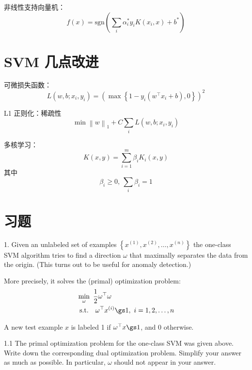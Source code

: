\documentclass[openany]{ctexbook}
\theoremstyle{kaiti}
\theoremstyle{normal}
\begin{document}
非线性支持向量机：
\begin{equation}
  f(x)=\mathrm{sgn} \left(\sum_i\alpha_{i}^{*}y_iK\left(x_i,x \right)+b^* \right)
\end{equation}

\section{SVM 几点改进}

可微损失函数：
\begin{equation}
  L\left(w,b;x_i,y_i \right)=\left(\max \left\{ 1-y_i\left(w^{\top}x_i+b \right),0 \right\}\right)^2
\end{equation}

L1 正则化：稀疏性
\begin{equation}
  \min \left\| w \right\|_1+C\sum_iL\left(w,b;x_i,y_i \right)
\end{equation}

多核学习：
\begin{equation}
  K\left(x,y \right)=\sum_{i=1}^{m}\beta_iK_i\left(x,y \right)
\end{equation}
其中
\begin{equation}
  \beta_i\geqslant 0,~\sum_i\beta_i=1
\end{equation}

\section{习题}


1. Given an unlabeled set of examples $\left\{x^{(1)},x^{(2)},\dots,x^{(n)} \right\} $ the one-class SVM algorithm tries to find a direction $\omega$ that maximally separates the data from the origin. (This turns out to be useful for anomaly detection.)

More precisely, it solves the (primal) optimization problem:
\begin{equation}
  \begin{aligned}
    &\min_\omega~\frac{1}{2}\omega^{\top}\omega \\
    &~\mathrm{s.t.}~~~\omega^{\top}x^{(i)}\gs1,~i=1,2,\dots,n
  \end{aligned}
\end{equation}

A new test example $x$ is labeled 1 if $\omega^{\top}x\gs1$, and 0 otherwise.

1.1 The primal optimization problem for the one-class SVM was given above. Write down the corresponding dual optimization problem. Simplify your answer as much as possible. In particular, $\omega$ should not appear in your answer.
\end{document}

